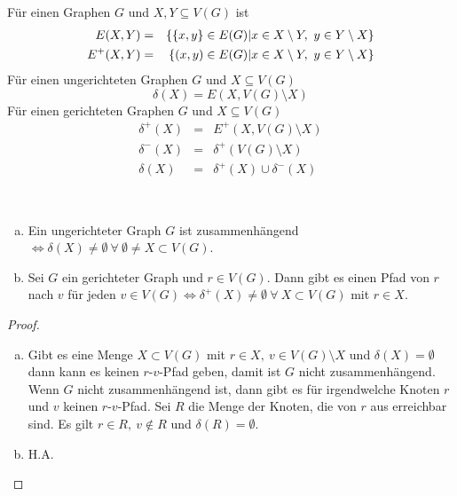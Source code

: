 \begin{definition}
	Für einen Graphen $G$ und $X,Y\subseteq V(G)$ ist
	\begin{eqnarray*}
		E(X,Y) &=& \{\{x,y\}\in E(G)\vert x \in X\setminus Y,~y \in Y\setminus X\}\\
		E^+(X,Y) &=& \{(x,y)\in E(G)\vert x \in X\setminus Y,~y \in Y\setminus X\}
	\end{eqnarray*}
	Für einen ungerichteten Graphen $G$ und $X \subseteq V(G)$
	\begin{equation*}
	\delta(X) = E(X, V(G)\setminus X)
	\end{equation*}
	Für einen gerichteten Graphen $G$ und $X\subseteq V(G)$
	\begin{eqnarray*}
		\delta^+(X) &=& E^+(X, V(G)\setminus X)\\
		\delta^-(X) &=& \delta^+(V(G)\setminus X)\\
		\delta(X) &=& \delta^+(X) \cup \delta^-(X)
	\end{eqnarray*}
\end{definition}
\begin{lemma}~
	\begin{enumerate}[a)]
		\item Ein ungerichteter Graph $G$ ist zusammenhängend $\Leftrightarrow \delta(X) \neq \emptyset~ \forall ~\emptyset \neq X \subset V(G)$.
		\item Sei $G$ ein gerichteter Graph und $r \in V(G)$. Dann gibt es einen Pfad von $r$ nach $v$ für jeden $v \in V(G) \Leftrightarrow \delta^+(X) \neq \emptyset~\forall~X\subset V(G)$ mit $r\in X$.
	\end{enumerate}
\end{lemma}
\begin{proof}~
	\begin{enumerate}[a)]
		\item Gibt es eine Menge $X\subset V(G)$ mit $r\in X,~v\in V(G)\setminus X$ und $\delta(X) = \emptyset$ dann kann es keinen $r$-$v$-Pfad geben, damit ist $G$ nicht zusammenhängend. Wenn $G$ nicht zusammenhängend ist, dann gibt es für irgendwelche Knoten $r$ und $v$ keinen $r$-$v$-Pfad. Sei $R$ die Menge der Knoten, die von $r$ aus erreichbar sind. Es gilt $r\in R,~v\notin R$ und $\delta(R)=\emptyset$.
		\item H.A.
	\end{enumerate}
\end{proof}

